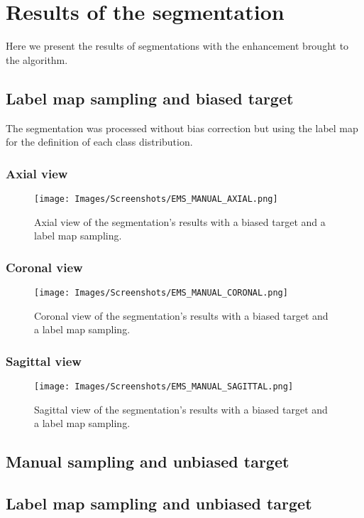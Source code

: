 \chapter{Results of the segmentation}\label{app:results}
Here we present the results of segmentations with the enhancement brought to the algorithm.

\section{Label map sampling and biased target}\label{f:LBF}
The segmentation was processed without bias correction but using the label map for the definition of each class distribution.

\subsection{Axial view}

\begin{figure}\centering
  \texttt{[image: Images/Screenshots/EMS\_MANUAL\_AXIAL.png]}
  \caption{Axial view of the segmentation's results with a biased target and 
 a label map sampling.}\label{fig:EMS_MANUAL_AXIAL}
\end{figure}

\subsection{Coronal view}

\begin{figure}\centering
  \texttt{[image: Images/Screenshots/EMS\_MANUAL\_CORONAL.png]}
  \caption{Coronal view of the segmentation's results with a biased target and 
 a label map sampling.}\label{fig:EMS_MANUAL_CORONAL}
\end{figure}

\subsection{Sagittal view}

\begin{figure}\centering
  \texttt{[image: Images/Screenshots/EMS\_MANUAL\_SAGITTAL.png]}
  \caption{Sagittal view of the segmentation's results with a biased target and 
 a label map sampling.}\label{fig:EMS_MANUAL_SAGITTAL}
\end{figure}

\section{Manual sampling and unbiased target}\label{f:M}


\section{Label map sampling and unbiased target}\label{f:L}